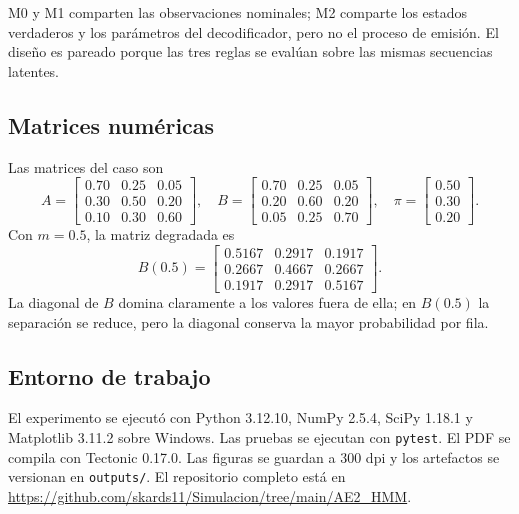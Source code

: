 \documentclass[11pt,letterpaper]{article}
\begin{document}
M0 y M1 comparten las observaciones nominales; M2 comparte los estados verdaderos y los parámetros del decodificador, pero no el proceso de emisión. El diseño es pareado porque las tres reglas se evalúan sobre las mismas secuencias latentes.

\subsection{Matrices numéricas}

Las matrices del caso son
\begin{equation}
A=\begin{bmatrix}
0.70 & 0.25 & 0.05\\
0.30 & 0.50 & 0.20\\
0.10 & 0.30 & 0.60
\end{bmatrix},
\quad
B=\begin{bmatrix}
0.70 & 0.25 & 0.05\\
0.20 & 0.60 & 0.20\\
0.05 & 0.25 & 0.70
\end{bmatrix},
\quad
\pi=\begin{bmatrix}0.50\\0.30\\0.20\end{bmatrix}.
\end{equation}
Con \(m=0.5\), la matriz degradada es
\begin{equation}
B(0.5)=\begin{bmatrix}
0.5167 & 0.2917 & 0.1917\\
0.2667 & 0.4667 & 0.2667\\
0.1917 & 0.2917 & 0.5167
\end{bmatrix}.
\end{equation}
La diagonal de \(B\) domina claramente a los valores fuera de ella; en \(B(0.5)\) la separación se reduce, pero la diagonal conserva la mayor probabilidad por fila.

\subsection{Entorno de trabajo}

El experimento se ejecutó con Python 3.12.10, NumPy 2.5.4, SciPy 1.18.1 y Matplotlib 3.11.2 sobre Windows. Las pruebas se ejecutan con \texttt{pytest}. El PDF se compila con Tectonic 0.17.0. Las figuras se guardan a 300 dpi y los artefactos se versionan en \texttt{outputs/}. El repositorio completo está en \url{https://github.com/skards11/Simulacion/tree/main/AE2_HMM}.
\end{document}

